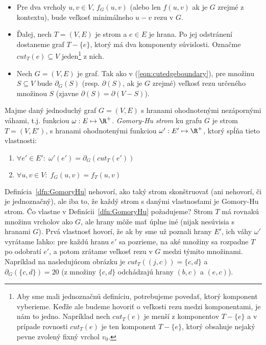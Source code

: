 \begin{itemize}
  \item Pre dva vrcholy $u,v\in V$, $f_G(u,v)$ (alebo
len $f(u,v)$ ak je $G$ zrejmé z kontextu), bude veľkosť minimálneho $u-v$ rezu v $G$. 
\item Ďalej,
nech $T=(V,E)$ je strom a $e\in E$ je hrana. Po jej odstránení dostaneme graf $T-\{e\}$, ktorý
má dva komponenty súvislosti. Označme $cut_T(e)\subseteq V$  
jeden\footnote{Aby sme mali jednoznačnú definíciu, potrebujeme povedať, ktorý komponent vyberieme.
  Keďže ale budeme hovoriť o veľkosti rezu medzi komponentami, 
  je nám to jedno. Napríklad nech $cut_T(e)$ je menší z komponentov $T-\{e\}$ 
  a v prípade rovnosti $cut_T(e)$ je 
ten komponent $T-\{e\}$, ktorý obsahuje nejaký pevne zvolený fixný vrchol $v_0$.}
z nich. 
\item Nech $G=(V,E)$ je graf. Tak ako v (\ref{eqn:cutedgeboundary}), 
  pre množinu $S\subseteq V$ bude $\partial_G(S)$ (resp. $\partial(S)$, ak je $G$ zrejmé)
veľkosť rezu určeného množinou $S$
(zjavne $\partial(S)=\partial(V-S)$).
\end{itemize}

\begin{framed}
  \begin{dfn}
    \label{dfn:GomoryHu}
    Majme daný jednoduchý graf $G=(V,E)$ s hranami ohodnotenými nezápornými váhami, t.j. funkciou
    $\omega:E\mapsto \R^+$. {\em Gomory-Hu strom} ku grafu $G$ je strom $T=(V,E')$, s hranami
    ohodnotenými funkciou  $\omega':E'\mapsto \R^+$, ktorý spĺňa tieto vlastnosti:
    \begin{enumerate}
      \item $\forall e'\in E':\;\omega'(e')=\partial_G(cut_T(e'))$
      \item $\forall u,v\in V:\;f_G(u,v)=f_T(u,v)$
    \end{enumerate}
  \end{dfn}
\end{framed}

Definícia~\ref{dfn:GomoryHu} nehovorí, ako taký strom skonštruovať (ani nehovorí, či je jednoznačný), ale iba
to, že každý strom s danými vlastnosťami je Gomory-Hu strom. Čo vlastne v Definícii~\ref{dfn:GomoryHu} požadujeme?
Strom $T$ má rovnakú množinu vrcholov ako $G$, ale hrany môže mať úplne iné (nijak nesúvisia s hranami $G$).
Prvá vlastnosť hovorí, že ak by sme už poznali hrany $E'$, ich váhy $\omega'$ vyrátame ľahko: pre každú
hranu $e'$ sa pozrieme, na aké množiny sa rozpadne $T$ po odobratí $e'$, a potom zrátame veľkosť
rezu v $G$ medzi týmito množinami. Napríklad na nasledujúcom obrázku je $cut_T((j,c))=\{c,d\}$
a $\partial_G(\{c,d\})=20$ (z množiny $\{c,d\}$ odchádzajú hrany $(b,c)$ a $(e,c)$).



